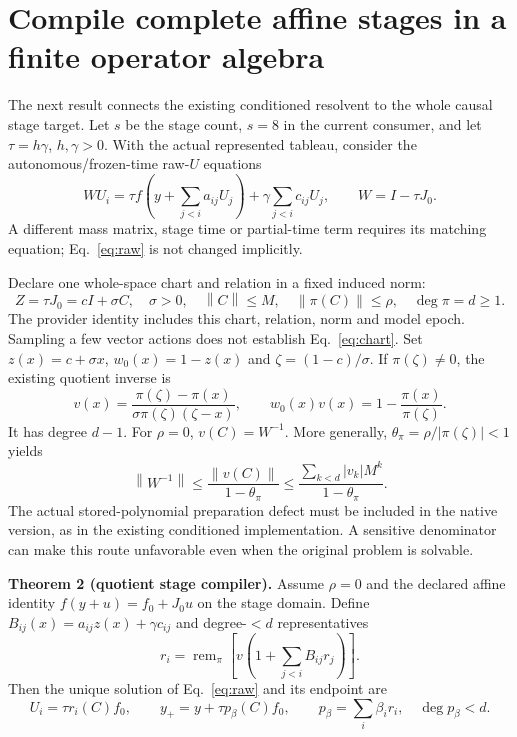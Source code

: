 \documentclass[aps,pra,reprint,onecolumn,10pt,notitlepage,nofootinbib]{revtex4-2}
\newcommand{\norm}[1]{\left\|#1\right\|}
\newcommand{\remp}{\operatorname{rem}}
\begin{document}
\section{Compile complete affine stages in a finite operator algebra}

The next result connects the existing conditioned resolvent to the whole
causal stage target. Let $s$ be the stage count, $s=8$ in the current consumer,
and let $\tau=h\gamma$, $h,\gamma>0$. With the actual represented tableau,
consider the autonomous/frozen-time raw-$U$ equations
\begin{equation}
 WU_i=\tau f\!\left(y+\sum_{j<i}a_{ij}U_j\right)
       +\gamma\sum_{j<i}c_{ij}U_j,
 \qquad W=I-\tau J_0.                                      \label{eq:raw}
\end{equation}
A different mass matrix, stage time or partial-time term requires its matching
equation; Eq.~\eqref{eq:raw} is not changed implicitly.

Declare one whole-space chart and relation in a fixed induced norm:
\begin{equation}
 Z=\tau J_0=cI+\sigma C,\quad \sigma>0,\quad
 \norm{C}\le M,\quad\norm{\pi(C)}\le\rho,\quad\deg\pi=d\ge1. \label{eq:chart}
\end{equation}
The provider identity includes this chart, relation, norm and model epoch.
Sampling a few vector actions does not establish Eq.~\eqref{eq:chart}.
Set $z(x)=c+\sigma x$, $w_0(x)=1-z(x)$ and
$\zeta=(1-c)/\sigma$. If $\pi(\zeta)\ne0$, the existing quotient inverse is
\begin{equation}
 v(x)=\frac{\pi(\zeta)-\pi(x)}
             {\sigma\pi(\zeta)(\zeta-x)},
 \qquad w_0(x)v(x)=1-\frac{\pi(x)}{\pi(\zeta)}.              \label{eq:inverse}
\end{equation}
It has degree $d-1$. For $\rho=0$, $v(C)=W^{-1}$. More generally,
$\theta_\pi=\rho/|\pi(\zeta)|<1$ yields
\begin{equation}
 \norm{W^{-1}}\le\frac{\norm{v(C)}}{1-\theta_\pi}
 \le\frac{\sum_{k<d}|v_k|M^k}{1-\theta_\pi}.                \label{eq:inversebound}
\end{equation}
The actual stored-polynomial preparation defect must be included in the native
version, as in the existing conditioned implementation. A sensitive denominator
can make this route unfavorable even when the original problem is solvable.

\textbf{Theorem 2 (quotient stage compiler).} Assume $\rho=0$ and the
declared affine identity $f(y+u)=f_0+J_0u$ on the stage domain. Define
$B_{ij}(x)=a_{ij}z(x)+\gamma c_{ij}$ and degree-$<d$ representatives
\begin{equation}
 r_i=\remp_\pi\left[v\left(1+\sum_{j<i}B_{ij}r_j\right)\right].
                                                                    \label{eq:compile}
\end{equation}
Then the unique solution of Eq.~\eqref{eq:raw} and its endpoint are
\begin{equation}
 U_i=\tau r_i(C)f_0,\qquad
 y_+=y+\tau p_\beta(C)f_0,\qquad
 p_\beta=\sum_i\beta_i r_i,\quad\deg p_\beta<d.               \label{eq:compiledoutput}
\end{equation}
\end{document}
